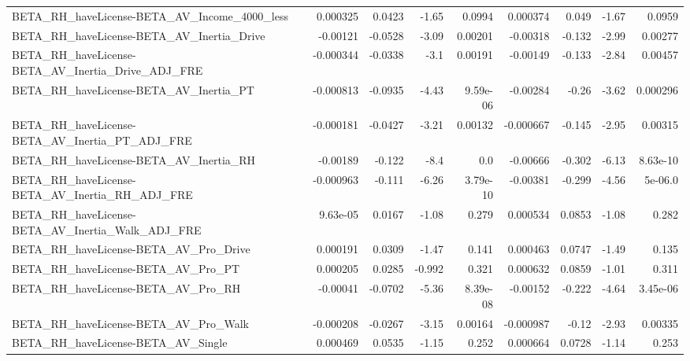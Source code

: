 \begin{tabular}{lrrrrrrrr}
BETA\_RH\_haveLicense-BETA\_AV\_Income\_4000\_less       &    0.000325 &       0.0423 &    -1.65 &   0.0994 &   0.000374 &       0.049 &        -1.67 &        0.0959 \\
BETA\_RH\_haveLicense-BETA\_AV\_Inertia\_Drive          &    -0.00121 &      -0.0528 &    -3.09 &  0.00201 &   -0.00318 &      -0.132 &        -2.99 &       0.00277 \\
BETA\_RH\_haveLicense-BETA\_AV\_Inertia\_Drive\_ADJ\_FRE  &   -0.000344 &      -0.0338 &     -3.1 &  0.00191 &   -0.00149 &      -0.133 &        -2.84 &       0.00457 \\
BETA\_RH\_haveLicense-BETA\_AV\_Inertia\_PT             &   -0.000813 &      -0.0935 &    -4.43 & 9.59e-06 &   -0.00284 &       -0.26 &        -3.62 &      0.000296 \\
BETA\_RH\_haveLicense-BETA\_AV\_Inertia\_PT\_ADJ\_FRE     &   -0.000181 &      -0.0427 &    -3.21 &  0.00132 &  -0.000667 &      -0.145 &        -2.95 &       0.00315 \\
BETA\_RH\_haveLicense-BETA\_AV\_Inertia\_RH             &    -0.00189 &       -0.122 &     -8.4 &      0.0 &   -0.00666 &      -0.302 &        -6.13 &      8.63e-10 \\
BETA\_RH\_haveLicense-BETA\_AV\_Inertia\_RH\_ADJ\_FRE     &   -0.000963 &       -0.111 &    -6.26 & 3.79e-10 &   -0.00381 &      -0.299 &        -4.56 &       5e-06.0 \\
BETA\_RH\_haveLicense-BETA\_AV\_Inertia\_Walk\_ADJ\_FRE   &    9.63e-05 &       0.0167 &    -1.08 &    0.279 &   0.000534 &      0.0853 &        -1.08 &         0.282 \\
BETA\_RH\_haveLicense-BETA\_AV\_Pro\_Drive              &    0.000191 &       0.0309 &    -1.47 &    0.141 &   0.000463 &      0.0747 &        -1.49 &         0.135 \\
BETA\_RH\_haveLicense-BETA\_AV\_Pro\_PT                 &    0.000205 &       0.0285 &   -0.992 &    0.321 &   0.000632 &      0.0859 &        -1.01 &         0.311 \\
BETA\_RH\_haveLicense-BETA\_AV\_Pro\_RH                 &    -0.00041 &      -0.0702 &    -5.36 & 8.39e-08 &   -0.00152 &      -0.222 &        -4.64 &      3.45e-06 \\
BETA\_RH\_haveLicense-BETA\_AV\_Pro\_Walk               &   -0.000208 &      -0.0267 &    -3.15 &  0.00164 &  -0.000987 &       -0.12 &        -2.93 &       0.00335 \\
BETA\_RH\_haveLicense-BETA\_AV\_Single                 &    0.000469 &       0.0535 &    -1.15 &    0.252 &   0.000664 &      0.0728 &        -1.14 &         0.253 \\

\end{tabular}
